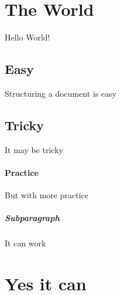 \documentclass{article}
\begin{document}
	\section{The World}
	Hello World!
	\subsection{Easy}
	Structuring a document is easy
	\subsection{Tricky}
	It may be tricky
	\paragraph{Practice}
	But with more practice
	\subparagraph{Subparagraph}
	It can work
	\section{Yes it can}
\end{document}
